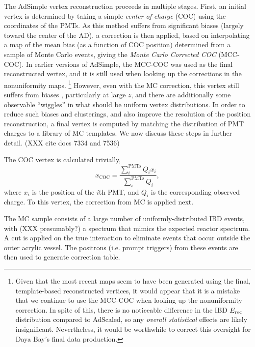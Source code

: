 \documentclass[../thesis.tex]{subfiles}
\begin{document}
The AdSimple vertex reconstruction proceeds in multiple stages. First, an
initial vertex is determined by taking a simple \emph{center of charge} (COC)
using the coordinates of the PMTs. As this method suffers from significant
biases (largely toward the center of the AD), a correction is then applied,
based on interpolating a map of the mean bias (as a function of COC position)
determined from a sample of Monte Carlo events, giving the \emph{Monte Carlo
  Corrected COC} (MCC-COC). In earlier versions of AdSimple, the MCC-COC was
used as the final reconstructed vertex, and it is still used when looking up the
corrections in the nonuniformity maps. \footnote{Given that the most recent maps
  seem to have been generated using the final, template-based reconstructed
  vertices, it would appear that it is a mistake that we continue to use the
  MCC-COC when looking up the nonuniformity correction. In spite of this, there
  is no noticeable difference in the IBD $E_\mathrm{rec}$ distribution compared to
  AdScaled, so any \emph{overall statistical} effects are likely
  insignificant. Nevertheless, it would be worthwhile to correct this oversight
  for Daya Bay's final data production.} However, even with the MC correction,
this vertex still suffers from biases , particularly at large $z$, and there are
additionally some observable ``wiggles'' in what should be uniform vertex
distributions. In order to reduce such biases and clusterings, and also improve
the resolution of the position reconstruction, a final vertex is computed by
matching the distribution of PMT charges to a library of MC templates. We now
discuss these steps in further detail. (XXX cite docs 7334 and 7536)


The COC vertex is calculated trivially,
\begin{equation*}
  x_{\mathrm{COC}} = \frac{\sum_{i}^{\mathrm{PMTs}} Q_i x_i}{\sum_i^{\mathrm{PMTs}} Q_i},
\end{equation*}
where $x_i$ is the position of the $i$th PMT, and $Q_i$ is the corresponding
observed charge. To this vertex, the correction from MC is applied next.

The MC sample consists of a large number of uniformly-distributed IBD events,
with (XXX presumably?) a spectrum that mimics the expected reactor spectrum. A
cut is applied on the true interaction to eliminate events that occur outside
the outer acrylic vessel. The positrons (i.e. prompt triggers) from these events
are then used to generate correction table.
\end{document}
